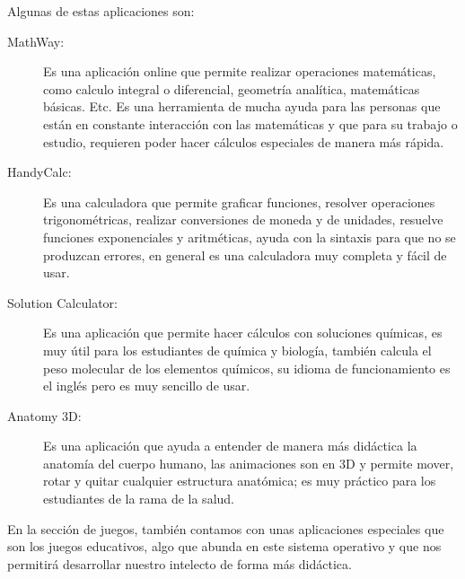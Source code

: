 Algunas de estas aplicaciones son:
\begin{description}
	\item[MathWay:] 
		Es una aplicación online que permite realizar operaciones matemáticas, como calculo integral o diferencial, geometría analítica, matemáticas básicas. Etc. Es una 	
		herramienta de mucha ayuda para las personas que están en constante interacción con las matemáticas y que para su trabajo o estudio, requieren poder hacer cálculos 
		especiales de manera más rápida.
	
	\item[HandyCalc:]
		Es una calculadora que permite graficar funciones, resolver operaciones trigonométricas, realizar conversiones de moneda y de unidades, resuelve funciones exponenciales y 
		aritméticas, ayuda con la sintaxis para que no se produzcan errores, en general es una calculadora muy completa y fácil de usar.
	
	\item[Solution Calculator:]
		Es una aplicación que permite hacer cálculos con soluciones químicas, es muy útil para los estudiantes de química y biología, también calcula el peso molecular de los 		
		elementos químicos, su idioma de funcionamiento es el inglés pero es muy sencillo de usar.
		
	\item[Anatomy 3D:]
		Es una aplicación que ayuda a entender de manera más didáctica la anatomía del cuerpo humano, las animaciones son en 3D y permite mover, rotar y quitar cualquier estructura 
		anatómica; es muy práctico para los estudiantes de la rama de la salud.
\end{description}

En la sección de juegos, también contamos con unas aplicaciones especiales que son los juegos educativos, algo que abunda en este sistema operativo y que nos permitirá 
desarrollar nuestro intelecto de forma más didáctica.
 
